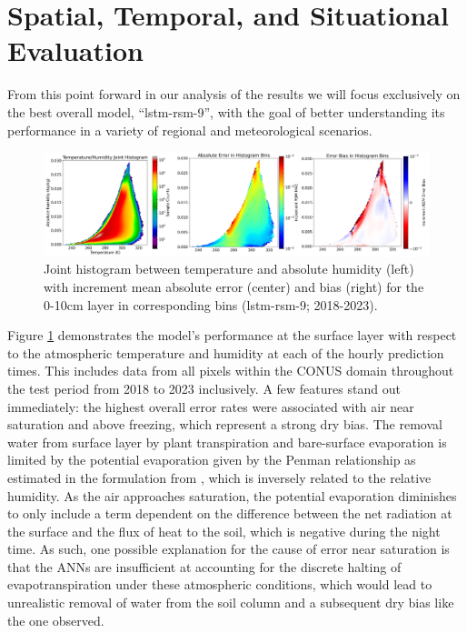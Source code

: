 \section{Spatial, Temporal, and Situational Evaluation}

From this point forward in our analysis of the results we will focus exclusively on the best overall model, ``lstm-rsm-9'', with the goal of better understanding its performance in a variety of regional and meteorological scenarios.

\begin{figure}[h!]
    \centering

    \includegraphics[width=.99\linewidth,draft=false]{figures/seq-eval_lstm-rsm-9/eval-grid_full_lstm-rsm-9_rsm-10_hist-humidity-temp_all-3.png}

    \caption{Joint histogram between temperature and absolute humidity (left) with increment mean absolute error (center) and bias (right) for the 0-10cm layer in corresponding bins (lstm-rsm-9; 2018-2023).}
    \label{bulk-eval_humidity-temp}
\end{figure}

Figure \ref{bulk-eval_humidity-temp} demonstrates the model's performance at the surface layer with respect to the atmospheric temperature and humidity at each of the hourly prediction times. This includes data from all pixels within the CONUS domain throughout the test period from 2018 to 2023 inclusively. A few features stand out immediately: the highest overall error rates were associated with air near saturation and above freezing, which represent a strong dry bias. The removal water from surface layer by plant transpiration and bare-surface evaporation is limited by the potential evaporation given by the Penman relationship as estimated in the formulation from \citep{mahrt_influence_1984}, which is inversely related to the relative humidity. As the air approaches saturation, the potential evaporation diminishes to only include a term dependent on the difference between the net radiation at the surface and the flux of heat to the soil, which is negative during the night time. As such, one possible explanation for the cause of error near saturation is that the ANNs are insufficient at accounting for the discrete halting of evapotranspiration under these atmospheric conditions, which would lead to unrealistic removal of water from the soil column and a subsequent dry bias like the one observed.

